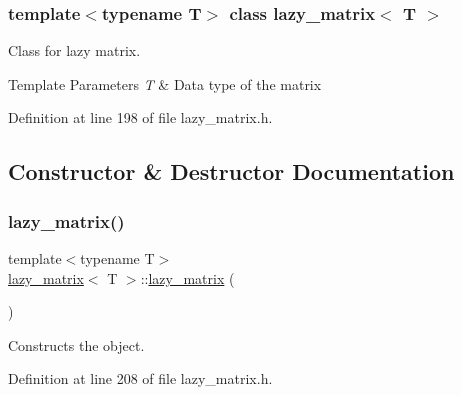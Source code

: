 \subsubsection*{template$<$typename T$>$\newline
class lazy\+\_\+matrix$<$ T $>$}

Class for lazy matrix. 


\begin{DoxyTemplParams}{Template Parameters}
{\em T} & Data type of the matrix \\
\hline
\end{DoxyTemplParams}


Definition at line 198 of file lazy\+\_\+matrix.\+h.



\subsection{Constructor \& Destructor Documentation}
\mbox{\label{classlazy__matrix_aef0a15c588094c4dadf2bd879be78d43}} 
\subsubsection{\texorpdfstring{lazy\_matrix()}{lazy\_matrix()}\hspace{0.1cm}{\footnotesize\ttfamily [1/6]}}
{\footnotesize\ttfamily template$<$typename T$>$ \\
\mbox{\hyperlink{classlazy__matrix}{lazy\+\_\+matrix}}$<$ T $>$\+::\mbox{\hyperlink{classlazy__matrix}{lazy\+\_\+matrix}} (\begin{DoxyParamCaption}{ }\end{DoxyParamCaption})\hspace{0.3cm}{\ttfamily [inline]}}



Constructs the object. 



Definition at line 208 of file lazy\+\_\+matrix.\+h.

\mbox{\label{classlazy__matrix_a354b6e228f5bc0991f759161e081f008}} 

